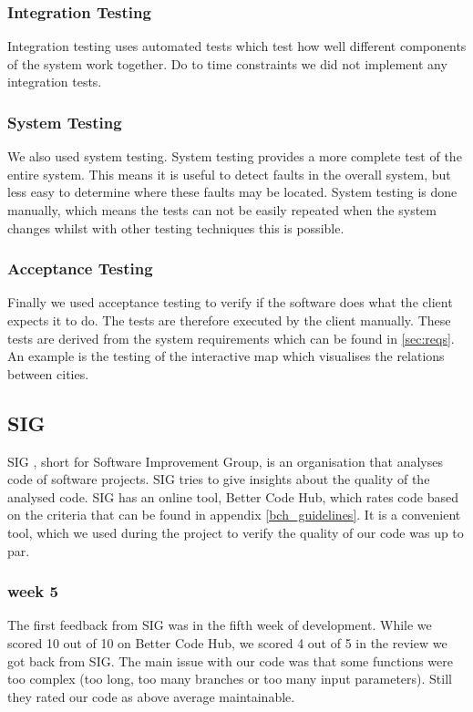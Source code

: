 \subsubsection{Integration Testing}
Integration testing uses automated tests which test how well different components of the system work together. Do to time constraints we did not implement any integration tests. 

\subsubsection{System Testing}
We also used system testing. System testing provides a more complete test of the entire system. This means it is useful to detect faults in the overall system, but less easy to determine where these faults may be located. System testing is done manually, which means the tests can not be easily repeated when the system changes whilst with other testing techniques this is possible.

\subsubsection{Acceptance Testing}\label{sec:acceptance-testing}
Finally we used acceptance testing to verify if the software does what the client expects it to do. The tests are therefore executed by the client manually. These tests are derived from the system requirements which can be found in \ref{sec:reqs}.\\
An example is the testing of the interactive map which visualises the relations between cities.

\subsection{SIG}
SIG \cite{sig}, short for Software Improvement Group, is an organisation that analyses code of software projects. SIG tries to give insights about the quality of the analysed code. SIG has an online tool, Better Code Hub, which rates code based on the criteria that can be found in appendix \ref{bch_guidelines}. It is a convenient tool, which we used during the project to verify the quality of our code was up to par.

\subsubsection{week 5}
The first feedback from SIG was in the fifth week of development. While we scored 10 out of 10 on Better Code Hub, we scored 4 out of 5 in the review we got back from SIG. The main issue with our code was that some functions were too complex (too long, too many branches or too many input parameters). Still they rated our code as above average maintainable.

